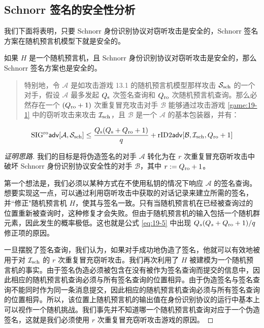 \subsection{Schnorr 签名的安全性分析}

我们下面将表明，只要 Schnorr 身份识别协议对窃听攻击是安全的，Schnorr 签名方案在随机预言机模型下就是安全的。

\begin{theorem}\label{theo:19-7}
如果 $H$ 是一个随机预言机，且 Schnorr 身份识别协议对窃听攻击是安全的，那么 Schnorr 签名方案也是安全的。

\begin{quote}
特别地，令 $\mathcal{A}$ 是如攻击游戏 13.1 的随机预言机模型那样攻击  $\mathcal{S}_{\rm sch}$ 的一个对手，假设 $\mathcal{A}$ 最多发起 $Q_{\rm s}$ 次签名查询和 $Q_{\rm ro}$ 次随机预言机查询。那么必然存在一个 $(Q_{\rm ro}+1)$ 次重复冒充攻击对手 $\mathcal{B}$ 能够通过攻击游戏 \ref{game:19-1} 中的窃听攻击来攻击  $\mathcal{I}_{\rm sch}$，且 $\mathcal{B}$ 是一个 $\mathcal{A}$ 的基本包装器，并有：
\end{quote}
\begin{equation}\label{eq:19-5}
{\rm SIG^{ro}\mathsf{adv}}[\mathcal{A}, \mathcal{S}_{\rm sch}]\leq\frac{Q_{\rm s}(Q_{\rm s}+Q_{\rm ro}+1)}{q}+{\rm rID2\mathsf{adv}}[\mathcal{B},\mathcal{I}_{\rm sch},Q_{\rm ro}+1]
\end{equation}
\end{theorem}

\begin{proof}[证明思路]
我们的目标是将伪造签名的对手 $\mathcal{A}$ 转化为在 $r$ 次重复冒充窃听攻击中破坏 Schnorr 身份识别协议安全性的对手 $\mathcal{B}$，其中 $r:=Q_{\rm ro}+1$。

第一个想法是，我们必须以某种方式在不使用私钥的情况下响应 $\mathcal{A}$ 的签名查询。想要实现这一点，可以通过利用窃听攻击中获取的对话记录来建立所需的签名，并``修正"随机预言机 $H$，使其与签名一致。只有当随机预言机在已经被查询过的位置重新被查询时，这种修复才会失败。但由于随机预言机的输入包括一个随机群元素，因此发生的概率极低。这也就是公式 \ref{eq:19-5} 中出现 ${Q_s(Q_s+Q_{\rm ro}+1)}/{q}$ 修正项的原因。

一旦摆脱了签名查询，我们认为，如果对手成功地伪造了签名，他就可以有效地被用于对  $\mathcal{I}_{\rm sch}$ 的 $r$ 次重复冒充窃听攻击。我们再次利用了 $H$ 被建模为一个随机预言机的事实。由于签名伪造必须被包含在没有被作为签名查询而提交的信息中，因此相应的随机预言机查询必须与所有签名查询的位置相异。由于伪造签名与签名查询不能同时作为同一条消息提交，因此相应的随机预言机查询必须与所有签名查询的位置相异。所以，该位置上随机预言机的输出值在身份识别协议的运行中基本上可以视作一个随机挑战。我们事先并不知道哪一个随机预言机查询对应于一个伪造签名，这就是我们必须使用 $r$ 次重复冒充窃听攻击游戏的原因。
\end{proof}

